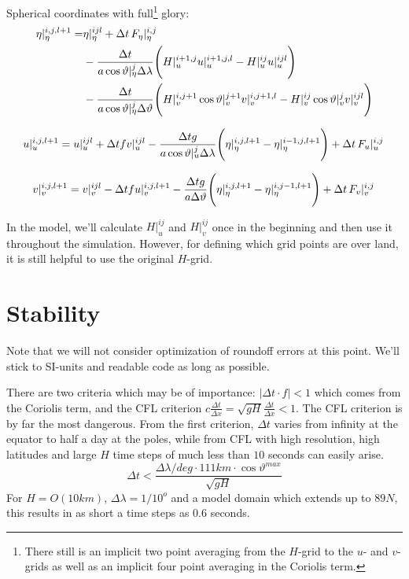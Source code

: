 \documentclass[a4paper]{article}
\begin{document}
Spherical coordinates with full\footnote{There still is an implicit two point
averaging from the $H$-grid to the $u$- and $v$-grids as well as an implicit
four point averaging in the Coriolis term.} glory:
\begin{equation}
  \begin{split}
    \eta|_\eta^{i,j,l+1}  =& \eta|_\eta^{ijl}  + \Delta t \,{F_\eta}\vert_{\eta}^{{i},{j}}\, \\
    & - \frac{\Delta t}{a\cos\vartheta|_\eta^{j}\Delta\lambda}
      \Biggl(H|_u^{i+1,j} u|_u^{i+1,j,l} - H|_u^{ij}u|_u^{ijl}\Biggr) \\
    & - \frac{\Delta t}{a\cos\vartheta|_\eta^{j}\Delta\vartheta}  
      \Biggl(H|_v^{i,j+1}\cos\vartheta|_v^{j+1}v|_v^{i,j+1,l} - H|_v^{ij}\cos\vartheta|_v^{j}v|_v^{ijl}\Biggr)
  \end{split}
\end{equation}

\begin{equation}
  u|_u^{i,j,l+1} = u|_u^{ijl} 
    + \Delta t f v|_u^{ijl}
    - \frac{\Delta t g}{a\cos\vartheta|_u^j\Delta\lambda}
      \Biggl(\eta|_\eta^{i,j,l+1} - \eta|_\eta^{i-1,j,l+1}\Biggr) + \Delta t \,{F_u}\vert_{u}^{{i},{j}}\,
\end{equation}

\begin{equation}
  v|_v^{i,j,l+1} = v|_v^{ijl} 
    - \Delta t f u|_v^{i,j,l+1} 
    - \frac{\Delta t g}{a\Delta\vartheta}
      \Biggl(\eta|_\eta^{i,j,l+1} - \eta|_\eta^{i,j-1,l+1}\Biggr) + \Delta t \,{F_v}\vert_{v}^{{i},{j}}\,
\end{equation}

In the model, we'll calculate $H|_u^{ij}$ and $H|_v^{ij}$ once in the beginning and
then use it throughout the simulation. However, for defining which grid points are 
over land, it is still helpful to use the original $H$-grid.


\section{Stability}

Note that we will not consider optimization of roundoff errors at this point. We'll stick
to SI-units and readable code as long as possible.

There are two criteria which may be of importance: $|\Delta t\cdot f|<1$ which comes from the
Coriolis term, and the CFL criterion $c\frac{\Delta t}{\Delta x}=\sqrt{gH}\frac{\Delta t}{\Delta x}<1$. The CFL
criterion is by far the most dangerous. From the first criterion, $\Delta t$ varies from infinity
at the equator to half a day at the poles, while from CFL with high resolution, high latitudes and 
large $H$ time steps of much less than $10$ seconds can easily arise.
\begin{equation}
  \Delta t < \frac{\Delta\lambda/deg \cdot 111km \cdot \cos\vartheta^{max}}{\sqrt{gH}} 
\end{equation}
For $H=O(10km)$, $\Delta\lambda=1/10^{o}$ and a model domain which extends up to $89N$, this results in 
as short a time steps as $0.6$ seconds.
\end{document}
